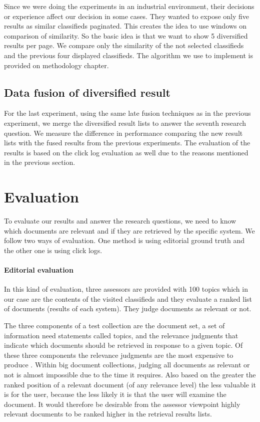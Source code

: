 Since we were doing the experiments in an industrial environment, their decisions or experience affect our decision in some cases. They wanted to expose only five results as similar classifieds paginated. This creates the idea to use windows on comparison of similarity. So the basic idea is that we want to show 5 diversified results per page. We compare only the similarity of the not selected classifieds and the previous four displayed classifieds. The algorithm we use to implement is provided on methodology chapter.

\subsection{Data fusion of diversified result}
For the last experiment, using the same late fusion techniques as in the previous experiment, we merge the diversified result lists to answer the seventh research question. We measure the difference in performance comparing the new result lists with the fused results from the previous experiments. The evaluation of the results is based on the click log evaluation as well due to the reasons mentioned in the previous section.




\section{Evaluation}

To evaluate our results and answer the research questions, we need to know which documents are relevant and if they are retrieved by the specific system. We follow two ways of evaluation. One method is using editorial ground truth and the other one is using click logs.

\paragraph{Editorial evaluation}

In this kind of evaluation, three assessors are provided with 100 topics which in our case are the contents of the visited classifieds and they evaluate a ranked list of documents (results of each system). They judge documents as relevant or not.

The three components of a test collection are the document set, a set of information need statements called topics, and the relevance judgments that indicate which documents should be retrieved in response to a given topic. Of these three components the relevance judgments are the most expensive to produce \cite{BuckleyDimmick}. Within big document collections, judging all documents as relevant or not is  almost impossible due to the time it requires. Also based on \cite{KalervoKekalainen} the greater the ranked position of a relevant document (of any relevance level) the less valuable it is for the user, because the less likely it is that the user will examine the document. It would therefore be desirable from the assessor viewpoint highly relevant documents to be ranked higher in the retrieval results lists.

